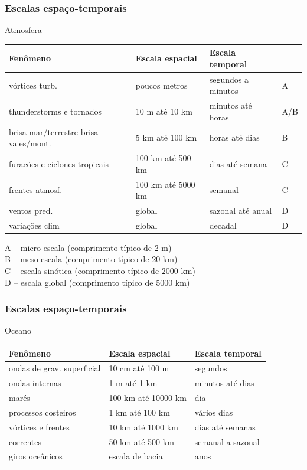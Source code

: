 \begin{frame}
  \frametitle{Escalas espaço-temporais}
  Atmosfera
  {\scriptsize
\begin{table}
    \begin{tabular}{|l|l|l|l|}
        \hline
        Fenômeno                              & Escala espacial    & Escala temporal    &  \\ \hline
        vórtices turb.                        & poucos metros      & segundos a minutos & A   \\
        thunderstorms e tornados              & 10 m até 10 km     & minutos até horas  & A/B \\
        brisa mar/terrestre brisa vales/mont. & 5 km até 100 km    & horas até dias     & B   \\
        furacões e ciclones tropicais         & 100 km até 500 km  & dias até semana    & C   \\
        frentes atmosf.                       & 100 km até 5000 km & semanal            & C   \\
        ventos pred.                          & global             & sazonal até anual  & D   \\
        variações clim                        & global             & decadal            & D   \\
        \hline
    \end{tabular}
\end{table}
A -- micro-escala (comprimento típico de 2 m)\\
B -- meso-escala (comprimento típico de 20 km)\\
C -- escala sinótica (comprimento típico de 2000 km)\\
D -- escala global (comprimento típico de 5000 km)\\
}
\end{frame}

\begin{frame}
  \frametitle{Escalas espaço-temporais}
  Oceano
  {\scriptsize
\begin{table}
    \begin{tabular}{|l|l|l|}
        \hline
        Fenômeno                   & Escala espacial     & Escala temporal   \\ \hline
        ondas de grav. superficial & 10 cm até 100 m     & segundos          \\
        ondas internas             & 1 m até 1 km        & minutos até dias  \\
        marés                      & 100 km até 10000 km & dia               \\
        processos costeiros        & 1 km até 100 km     & vários dias       \\
        vórtices e frentes         & 10 km até 1000 km   & dias até semanas  \\
        correntes                  & 50 km até 500 km    & semanal a sazonal \\
        giros oceânicos            & escala de bacia     & anos\\
        \hline
    \end{tabular}
\end{table}
}
\end{frame}

